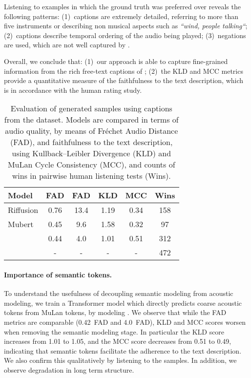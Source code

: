 Listening to examples in which the ground truth was preferred over \model{} reveals the following patterns:
(1)~captions are extremely detailed, referring to more than five instruments or describing non musical aspects such as \textit{``wind, people talking``}; (2)~captions describe temporal ordering of the audio being played; (3)~negations are used, which are not well captured by \mulan.

Overall, we conclude that: (1)~our approach is able to capture fine-grained information from the rich free-text captions of \dataset{}; (2)~the KLD and MCC metrics provide a quantitative measure of the faithfulness to the text description, which is in accordance with the human rating study.

\begin{table}
\setlength{\tabcolsep}{4pt}
\caption{Evaluation of generated samples using captions from the {\dataset} dataset. Models are compared in terms of audio quality, by means of Fréchet Audio Distance (FAD), and faithfulness to the text description, using Kullback–Leibler Divergence (KLD) and  MuLan Cycle Consistency (MCC), and counts of wins in pairwise human listening tests (Wins).}
\label{table:quant-eval}
\vskip 0.15in
\begin{center}
\scriptsize
\begin{sc}
\begin{tabular}{lccccc}
\toprule
Model & FAD  & FAD  & KLD  & MCC  & Wins  \\
\midrule

Riffusion & 0.76 & 13.4 & 1.19 & 0.34 & 158 \\
Mubert & 0.45 & 9.6 & 1.58 & 0.32 & 97 \\
\model{} & 0.44 & 4.0 & 1.01 & 0.51 & 312 \\
\midrule
\datasetshort{} & - & - & - & - & 472 \\
\bottomrule
\end{tabular}
\end{sc}
\end{center}
\vskip -0.1in
\end{table}



\paragraph{Importance of semantic tokens.}
\label{results/semantic-tokens}
To understand the usefulness of decoupling semantic modeling from acoustic modeling, we train a Transformer model which directly predicts coarse acoustic tokens from MuLan tokens, by modeling .
We observe that while the FAD metrics are comparable (0.42~FAD and 4.0~FAD), KLD and MCC scores worsen when removing the semantic modeling stage. In particular the KLD score increases from 1.01 to 1.05, and the MCC score decreases from 0.51 to 0.49, indicating that semantic tokens facilitate the adherence to the text description.
We also confirm this qualitatively by listening to the samples. In addition, we observe degradation in long term structure.



